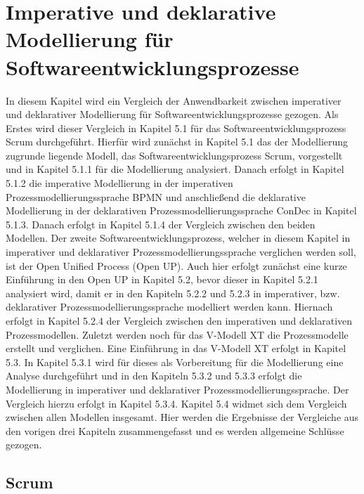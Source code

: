 \chapter{Imperative und deklarative Modellierung für Softwareentwicklungsprozesse}\label{sec:chapter6}
In diesem Kapitel wird ein Vergleich der Anwendbarkeit zwischen imperativer und deklarativer Modellierung für Softwareentwicklungsprozesse gezogen. Als Erstes wird dieser Vergleich in Kapitel 5.1 für das Softwareentwicklungsprozess Scrum durchgeführt. Hierfür wird zunächst in Kapitel 5.1 das der Modellierung zugrunde liegende Modell, das Softwareentwicklungsprozess Scrum, vorgestellt und in Kapitel 5.1.1 für die Modellierung analysiert. Danach erfolgt in Kapitel 5.1.2 die imperative Modellierung in der imperativen Prozessmodellierungssprache BPMN und anschließend die deklarative Modellierung in der deklarativen Prozessmodellierungssprache ConDec in Kapitel 5.1.3. Danach erfolgt  in Kapitel 5.1.4 der Vergleich zwischen den beiden Modellen.\newline
Der zweite Softwareentwicklungsprozess, welcher in diesem Kapitel in imperativer und deklarativer Prozessmodellierungssprache verglichen werden soll, ist der Open Unified Process (Open UP). Auch hier erfolgt zunächst eine kurze Einführung in den Open UP in Kapitel 5.2, bevor dieser in Kapitel 5.2.1 analysiert wird, damit er in den Kapiteln 5.2.2 und 5.2.3 in imperativer, bzw. deklarativer Prozessmodellierungssprache modelliert werden kann. Hiernach erfolgt in Kapitel 5.2.4 der Vergleich zwischen den imperativen und deklarativen Prozessmodellen.\newline
Zuletzt werden noch für das V-Modell XT die Prozessmodelle erstellt und verglichen. Eine Einführung in das V-Modell XT erfolgt in Kapitel 5.3. In Kapitel 5.3.1 wird für dieses als Vorbereitung für die Modellierung eine Analyse durchgeführt und in den Kapiteln 5.3.2 und 5.3.3 erfolgt die Modellierung in imperativer und deklarativer Prozessmodellierungssprache. Der Vergleich hierzu erfolgt in Kapitel 5.3.4.\newline
Kapitel 5.4 widmet sich dem Vergleich zwischen allen Modellen insgesamt. Hier werden die Ergebnisse der Vergleiche aus den vorigen drei Kapiteln zusammengefasst und es werden allgemeine Schlüsse gezogen.\newline


\section{Scrum}\label{sec:chapter6:Imperative Modellierung}

